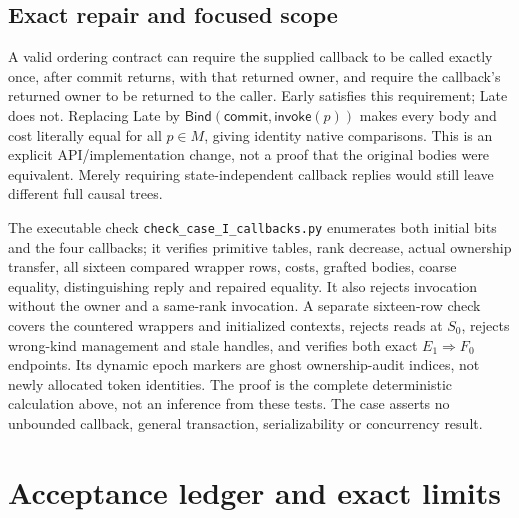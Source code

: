 \documentclass[11pt,a4paper]{article}
\theoremstyle{definition}
\newcommand{\Bind}{\mathsf{Bind}}
\newcommand{\Invoke}{\mathsf{invoke}}
\begin{document}
\subsection{Exact repair and focused scope}
A valid ordering contract can require the supplied callback to be called
exactly once, after commit returns, with that returned owner, and require
the callback's returned owner to be returned to the caller. Early satisfies
this requirement; Late does not. Replacing Late by
$\Bind(\mathsf{commit},\Invoke(p))$ makes every body and cost literally
equal for all $p\in M$, giving identity native comparisons. This is an
explicit API/implementation change, not a proof that the original bodies
were equivalent. Merely requiring state-independent callback replies
would still leave different full causal trees.

The executable check \texttt{check\_case\_I\_callbacks.py} enumerates
both initial bits and the four callbacks; it verifies primitive tables,
rank decrease, actual ownership transfer, all sixteen compared wrapper
rows, costs, grafted bodies, coarse equality, distinguishing reply and
repaired equality. It also rejects invocation without the owner and a
same-rank invocation. A separate sixteen-row check covers the countered
wrappers and initialized contexts, rejects reads at $S_0$, rejects
wrong-kind management and stale handles, and verifies both exact
$E_1\Rightarrow F_0$ endpoints. Its dynamic epoch markers are ghost
ownership-audit indices, not newly allocated token identities. The proof is the complete deterministic calculation
above, not an inference from these tests. The case asserts no unbounded
callback, general transaction, serializability or concurrency result.


\section{Acceptance ledger and exact limits}\label{sec:acceptance}
\end{document}
